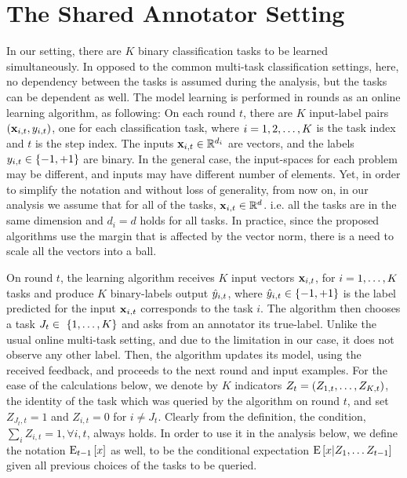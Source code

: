 \chapter{The Shared Annotator Setting}


In our setting, there are $K$  binary classification tasks to be learned simultaneously. 
In opposed to the common multi-task classification settings, here, no dependency between the tasks 
is assumed during the analysis, but the tasks can be dependent as well. 
The model learning is performed in rounds as an online learning algorithm, as following: 
On each round $t$, there are $K$ input-label pairs
$(\mathbf{x}_{i,t},y_{i,t})$, one for each classification task, where $i=1,2, \ldots , K$ is the task index and $t$ is the 
step index. The inputs $\mathbf{x}_{i,t}\in\mathbb{R}^{d_i}$ are vectors, and the labels  $y_{i,t}\in\{-1,+1\}$ are binary. 
In the general case, the input-spaces for each problem may be different, and inputs may
have different number of elements. Yet, in order to  simplify the notation and without loss of generality,  
from now on, in our analysis we assume that for all of the tasks, $\mathbf{x}_{i,t}\in\mathbb{R}^{d}$. 
i.e. all the tasks are in the same dimension and $d_i = d$ holds for all tasks.
In practice, since the proposed algorithms use the margin that is affected by the vector norm, 
there is a need to scale all the vectors into a ball.

On round $t$, the learning algorithm receives $K$ input vectors $\mathbf{x}_{i,t}$, 
for $i=1 , \ldots , K$ tasks and produce  $K$  binary-labels output $\hat{y}_{i,t}$, where
$\hat{y}_{i,t}\in\{-1,+1\}$ is the label predicted for the input
$\mathbf{x}_{i,t}$ corresponds to the task $i$. The algorithm then chooses a task $J_t \in\
\{1 , \ldots , K\}$ and asks from an annotator its true-label. Unlike the usual online multi-task setting, and due to the limitation in our
case, it  does not observe any other label. 
Then, the algorithm updates its model, using the received feedback, and proceeds to the
next round and input examples.  
For the ease of the calculations below, we denote by $K$ indicators 
$Z_t=\left({ Z_{1,t} , \ldots , Z_{K,t}}\right)$, the identity of the task which was queried by the algorithm
on round $t$, and set $Z_{J_t,t}=1$  and $Z_{i,t}=0$ for $i\ne J_t$. 
Clearly from the definition, the condition, $\sum_i{Z_{i,t}=1} ,\forall{i,t}$, always holds. 
In order to use it in the analysis below, we define the notation ${\rm E}_{t-1}\left[{x}\right]$ as well, to be the
conditional expectation ${\rm E}\left[{x \vert Z_{1},\ldots Z_{t-1}}\right]$ given all previous choices of the tasks to be queried.


